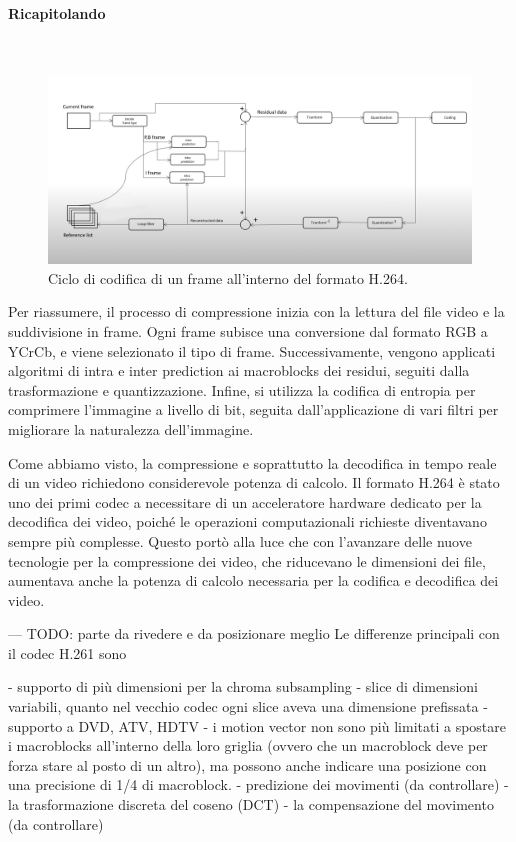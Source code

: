 \documentclass[a4paper,12pt, oneside]{article}
\begin{document}
\paragraph{Ricapitolando}\hphantom{A}\\
\begin{figure}[h]
    \centering
    \includegraphics[width=1\textwidth]{images/h264-coding-loop.png}
    \caption{Ciclo di codifica di un frame all'interno del formato H.264.}
    \label{fig:h264_coding_loop}
\end{figure}

\noindent Per riassumere, il processo di compressione inizia con la lettura del file video e la
suddivisione in frame. Ogni frame subisce una conversione dal formato RGB a YCrCb, e viene
selezionato il tipo di frame. Successivamente, vengono applicati algoritmi di intra e inter prediction
ai macroblocks dei residui, seguiti dalla trasformazione e quantizzazione. Infine, si utilizza la
codifica di entropia per comprimere l'immagine a livello di bit, seguita dall'applicazione di vari
filtri per migliorare la naturalezza dell'immagine.

Come abbiamo visto, la compressione e soprattutto la decodifica in tempo reale di un video richiedono
considerevole potenza di calcolo. Il formato H.264 è stato uno dei primi codec a necessitare di un
acceleratore hardware dedicato per la decodifica dei video, poiché le operazioni computazionali richieste
diventavano sempre più complesse. Questo portò alla luce che con l'avanzare delle nuove tecnologie per
la compressione dei video, che riducevano le dimensioni dei file, aumentava anche la potenza di calcolo
necessaria per la codifica e decodifica dei video.

---
TODO: parte da rivedere e da posizionare meglio
Le differenze principali con il codec H.261 sono

- supporto di più dimensioni per la chroma subsampling
- slice di dimensioni variabili, quanto nel vecchio codec ogni slice aveva una dimensione prefissata
- supporto a DVD, ATV, HDTV
- i motion vector non sono più limitati a spostare i macroblocks all'interno della loro griglia
(ovvero che un macroblock deve per forza stare al posto di un altro), ma possono anche indicare una
posizione con una precisione di 1/4 di macroblock.
- predizione dei movimenti  (da controllare)
- la trasformazione discreta del coseno (DCT)
- la compensazione del movimento (da controllare)
\end{document}
